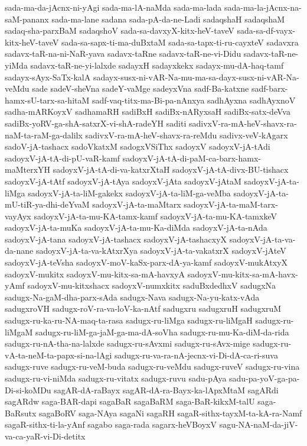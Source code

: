 {sada-ma-da-jAcnx-ni-yAgi
sada-ma-lA-naMda
sada-ma-lada
sada-ma-la-jAcnx-na-saM-pananx
sada-ma-lane
sadana
sada-pA-da-ne-Ladi
sadaqshaH
sadaqshaM
sadaq-sha-parxBaM
sadaqshoV
sada-sa-davxyX-kitx-heV-taveV
sada-sa-df-vayx-kitx-heV-taveV
sada-sa-sapx-ti-ma-duBxtaM
sada-sa-tapx-ti-ru-cayxteV
sadavxra
sadavx-taR-na-ni-NaR-yava
sadavx-taRne
sadavx-taR-ne-vi-Didu
sadavx-taR-ne-yiMda
sadavx-taR-ne-yi-lalxde
sadayxH
sadayxkekx
sadayx-mu-dA-haq-tamf
sadayx-sAyx-SaTx-kalA
sadayx-susx-ni-vAR-Na-mu-ma-sa-dayx-susx-ni-vAR-Na-veMdu
sade
sadeV-sheVna
sadeY-vaMge
sadeyxVna
sadf-Ba-katxne
sadf-barx-hamx-sU-tarx-sa-hitaM
sadf-vaq-titx-ma-Bi-pa-nAnxya
sadhAyxna
sadhAyxnoV
sadha-mARKoyxV
sadhamaRH
sadiBxH
sadiBx-nARyxsaH
sadiBx-satx-deVva
sadiBx-yoRV-ga-shA-satxrX-vi-shA-radeYH
saditi
sadivxV-ra-mA-heV-shavx-ra-naM-ta-raM-ga-dalilx
sadivxV-ra-mA-heV-shavx-ra-reMdu
sadivx-veV-kAgarx
sadoV-jA-tashacx
sadoVkatxM
sadogxVSiThx
sadoyxV
sadoyxV-jA-tAdi
sadoyxV-jA-tA-di-pU-vaR-kamf
sadoyxV-jA-tA-di-paM-ca-barx-hamx-maMterxYH
sadoyxV-jA-tA-di-va-katxrXtaH
sadoyxV-jA-tA-divx-BU-tishacx
sadoyxV-jA-tAtf
sadoyxV-jA-tAya
sadoyxV-jAta
sadoyxV-jAtaM
sadoyxV-jA-ta-liMga
sadoyxV-jA-ta-liM-gakekx
sadoyxV-jA-ta-liM-ga-veMba
sadoyxV-jA-ta-mU-tiR-ya-dhi-deYvaM
sadoyxV-jA-ta-maMtarx
sadoyxV-jA-ta-maM-tarx-vayAyx
sadoyxV-jA-ta-mu-KA-tamx-kamf
sadoyxV-jA-ta-mu-KA-tamxkeV
sadoyxV-jA-ta-muKa
sadoyxV-jA-ta-mu-Ka-diMda
sadoyxV-jA-ta-nAda
sadoyxV-jA-tana
sadoyxV-jA-tashacx
sadoyxV-jA-tashacxyX
sadoyxV-jA-ta-va-da-nane
sadoyxV-jA-ta-va-kAtxrXya
sadoyxV-jA-ta-vakatxrX
sadoyxV-jAteV
sadoyxV-jA-teVsha
sadoyxV-moV-kaSx-parx-dA-ya-kamf
sadoyxV-mukAtxyX
sadoyxV-mukitx
sadoyxV-mu-kitx-sa-mA-havxyA
sadoyxV-mu-kitx-sa-mA-havx-yAmf
sadoyxV-mu-kitxshacx
sadoyxV-numxkitx
saduBxdedhxV
sadugxNa
sadugx-Na-gaM-dha-parx-sAda
sadugx-Nava
sadugx-Na-yu-katx-vAda
sadugxroVH
sadugx-roV-ra-va-loV-ka-nAtf
sadugxru
sadugxruH
sadugxruM
sadugx-ru-ka-ru-NA-maq-ta-rasa
sadugx-ru-liMga
sadugx-ru-liMgaH
sadugx-ru-liMgaM
sadugx-ru-liM-ga-jaM-ga-ma-dA-soVha
sadugx-ru-mu-Ka-diM-da-rida
sadugx-ru-nA-tha-na-lalxde
sadugx-ru-sAvxmi
sadugx-ru-sAvx-mige
sadugx-ru-vA-ta-neM-ta-papx-si-na-lAgi
sadugx-ru-va-ra-nA-jecnx-vi-Di-dA-ca-ri-suva
sadugx-ruve
sadugx-ru-veM-buda
sadugx-ru-veMdu
sadugx-ruveV
sadugx-ru-vina
sadugx-ru-vi-niMda
sadugx-ru-vitatx
sadugx-ruvu
sadu-pAya
sadu-pa-yoV-ga-pa-Di-si-koMDu
sagAR-dA-raBayx
sagAR-dA-ra-Bayx-ka-lApxMtaM
sagARdi
sagARdw
saga-BAR-dapi
sagaBaR
sagaBaRM
saga-BaR-kikxM-talU
saga-BaRsutx
sagaBoRV
saga-NAya
sagaNi
sagaRH
sagaR-sithx-tayxM-ta-kA-ra-Namf
sagaR-sithx-ti-la-yAnf
sagabo
saga-rada
sagarx-heVBoyxV
sagu-NA-naM-da-jiV-va-ca-yaR-vi-Di-detitx
}
